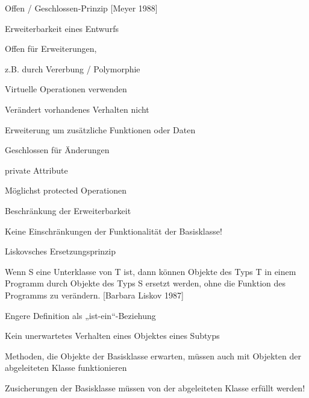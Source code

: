 \documentclass[a4paper]{article}
\begin{document}
\begin{multicols}{3}
  Offen / Geschlossen-Prinzip [Meyer 1988]
  \begin{itemize*}
    \item Erweiterbarkeit eines Entwurfs
    \item Offen für Erweiterungen,
    \begin{itemize*}
      \item z.B. durch Vererbung / Polymorphie
      \item Virtuelle Operationen verwenden
      \item Verändert vorhandenes Verhalten nicht
      \item Erweiterung um zusätzliche Funktionen oder Daten
    \end{itemize*}
    \item Geschlossen für Änderungen
    \begin{itemize*}
      \item private Attribute
      \item Möglichst protected Operationen
    \end{itemize*}
    \item Beschränkung der Erweiterbarkeit
    \begin{itemize*}
      \item Keine Einschränkungen der Funktionalität der Basisklasse!
    \end{itemize*}
  \end{itemize*}

  Liskovsches Ersetzungsprinzip
  \begin{itemize*}
    \item Wenn S eine Unterklasse von T ist, dann können Objekte des Typs T in einem Programm durch Objekte des Typs S ersetzt werden, ohne die Funktion des Programms zu verändern. [Barbara Liskov 1987]
    \item Engere Definition als „ist-ein“-Beziehung
    \item Kein unerwartetes Verhalten eines Objektes eines Subtyps
    \item Methoden, die Objekte der Basisklasse erwarten, müssen auch mit Objekten der abgeleiteten Klasse funktionieren
    \item Zusicherungen der Basisklasse müssen von der abgeleiteten Klasse erfüllt werden!
  \end{itemize*}


\end{multicols}
\end{document}
